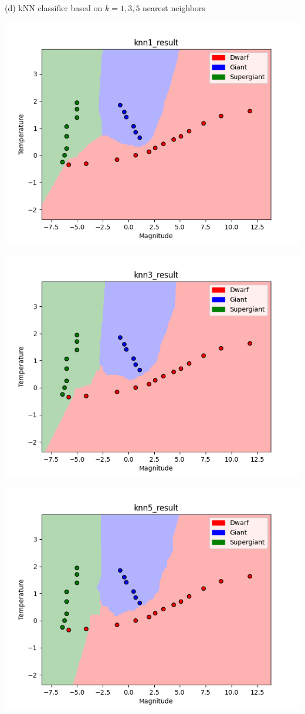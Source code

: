 \documentclass[submit]{harvardml}
\begin{document}
(d) kNN classifier based on $k = 1, 3, 5$ nearest neighbors
\begin{center}
    \includegraphics[scale=0.7]{HW2/knn1_result.png}
\end{center}
\begin{center}
    \includegraphics[scale=0.7]{HW2/knn3_result.png}
\end{center}
\begin{center}
    \includegraphics[scale=0.7]{HW2/knn5_result.png}
\end{center}
\end{document}
